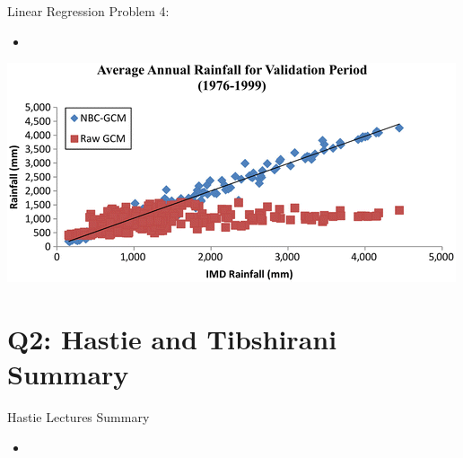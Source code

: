 \documentclass{beamer}
\begin{document}
\begin{frame}{Linear Regression Problem 4: }
	\begin{itemize}
		\item
	\end{itemize}
	\includegraphics[width=0.75\linewidth]{SelectionBias}
\end{frame}

\section[Q2]{Q2: Hastie and Tibshirani Summary}

\begin{frame}{Hastie Lectures Summary}
	\begin{itemize}
		\item 
	\end{itemize}
\end{frame}


\end{document}
